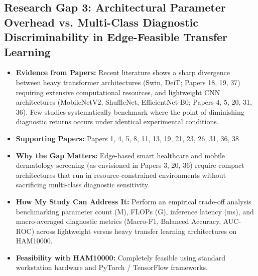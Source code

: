\documentclass[11pt,a4paper]{article}
\begin{document}
\subsection{Research Gap 3: Architectural Parameter Overhead vs. Multi-Class Diagnostic Discriminability in Edge-Feasible Transfer Learning}
\begin{itemize}
\item \textbf{Evidence from Papers:} Recent literature shows a sharp divergence between heavy transformer architectures (Swin, DeiT; Papers 18, 19, 37) requiring extensive computational resources, and lightweight CNN architectures (MobileNetV2, ShuffleNet, EfficientNet-B0; Papers 4, 5, 20, 31, 36). Few studies systematically benchmark where the point of diminishing diagnostic returns occurs under identical experimental conditions.
\item \textbf{Supporting Papers:} Papers 1, 4, 5, 8, 11, 13, 19, 21, 23, 26, 31, 36, 38
\item \textbf{Why the Gap Matters:} Edge-based smart healthcare and mobile dermatology screening (as envisioned in Papers 3, 20, 36) require compact architectures that run in resource-constrained environments without sacrificing multi-class diagnostic sensitivity.
\item \textbf{How My Study Can Address It:} Perform an empirical trade-off analysis benchmarking parameter count (M), FLOPs (G), inference latency (ms), and macro-averaged diagnostic metrics (Macro-F1, Balanced Accuracy, AUC-ROC) across lightweight versus heavy transfer learning architectures on HAM10000.
\item \textbf{Feasibility with HAM10000:} Completely feasible using standard workstation hardware and PyTorch / TensorFlow frameworks.
\end{itemize}
\end{document}
